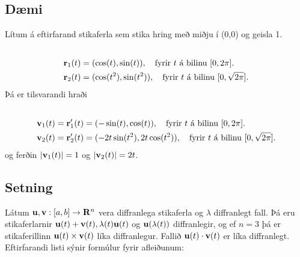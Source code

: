 \documentclass[a4paper,10pt,icelandic]{sphinxmanual}
\begin{document}
\subsection{Dæmi}
\label{Kafli1:id4}
Lítum á eftirfarand stikaferla sem stika hring með miðju í (0,0) og
geisla 1.
\begin{gather}
\begin{split}\displaystyle\end{split}\notag\\\begin{split}\begin{aligned}
\mbox{${\bf r}$}_1(t) &= (\cos(t),\sin(t)), \quad \text{fyrir $t$ á bilinu $[0,2\pi].$} \\
\mbox{${\bf r}$}_2(t) &= (\cos(t^2),\sin(t^2)), \quad \text{fyrir $t$ á bilinu $[0,\sqrt{2\pi}].$} \end{aligned}\end{split}\notag
\end{gather}
Þá er tilsvarandi hraði
\begin{gather}
\begin{split}\displaystyle\end{split}\notag\\\begin{split}\begin{aligned}
\mbox{${\bf v}$}_1(t) = \mbox{${\bf r}$}_1'(t) &= (-\sin(t),\cos(t)), \quad \text{fyrir $t$ á bilinu $[0,2\pi].$} \\
\mbox{${\bf v}$}_2(t) = \mbox{${\bf r}$}_2'(t) &= (-2t\sin(t^2),2t\cos(t^2)),  \quad \text{fyrir $t$ á bilinu $[0,\sqrt{2\pi}].$}\end{aligned}\end{split}\notag
\end{gather}
og ferðin \(|\mbox{${\bf v}$}_1(t)| = 1\) og
\(|\mbox{${\bf v}$}_2(t)| = 2t\).


\subsection{Setning}
\label{Kafli1:id5}
Látum
\(\mbox{${\bf u}$},\mbox{${\bf v}$}:[a,b]\rightarrow \mbox{${\bf R}^n$}\)
vera diffranlega stikaferla og \(\lambda\) diffranlegt fall. Þá eru
stikaferlarnir
\(\mbox{${\bf u}$}(t)+\mbox{${\bf v}$}(t), \lambda(t)\mbox{${\bf u}$}(t)\)
og \(\mbox{${\bf u}$}(\lambda(t))\) diffranlegir, og ef \(n=3\)
þá er stikaferillinn
\(\mbox{${\bf u}$}(t)\times \mbox{${\bf v}$}(t)\) líka diffranlegur.
Fallið \(\mbox{${\bf u}$}(t)\cdot\mbox{${\bf v}$}(t)\) er líka
diffranlegt. Eftirfarandi listi sýnir formúlur fyrir afleiðunum:
\end{document}
